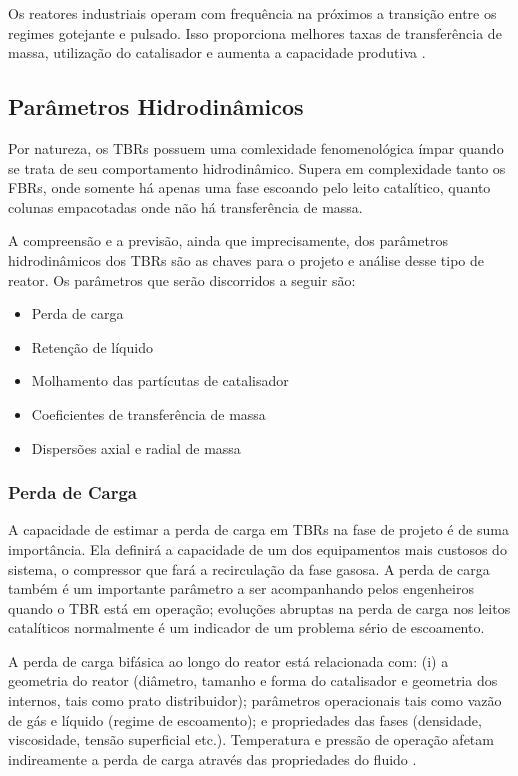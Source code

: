 Os reatores industriais operam com frequência na próximos a transição entre os
regimes gotejante e pulsado. Isso proporciona melhores taxas de transferência de
massa, utilização do catalisador e aumenta a capacidade produtiva
\cite{Ancheyta2011}.

\subsection{Parâmetros Hidrodinâmicos}
\label{sec:parametroshidrodinamicos}

Por natureza, os TBRs possuem uma comlexidade fenomenológica ímpar quando se
trata de seu comportamento hidrodinâmico. Supera em complexidade tanto os FBRs,
onde somente há apenas uma fase escoando pelo leito catalítico, quanto colunas
empacotadas onde não há transferência de massa. 

A compreensão e a previsão, ainda que imprecisamente, dos parâmetros
hidrodinâmicos dos TBRs são as chaves para o projeto e análise desse tipo de
reator. Os parâmetros que serão discorridos a seguir são:

\begin{itemize}
  \item Perda de carga
  \item Retenção de líquido
  \item Molhamento das partícutas de catalisador
  \item Coeficientes de transferência de massa
  \item Dispersões axial e radial de massa
\end{itemize}

\subsubsection{Perda de Carga}
\label{sec:perdadecarga}

A capacidade de estimar a perda de carga em TBRs na fase de projeto é de suma
importância. Ela definirá a capacidade de um dos equipamentos mais custosos do
sistema, o compressor que fará a recirculação da fase gasosa. A perda de carga
também é um importante parâmetro a ser acompanhando pelos engenheiros quando o
TBR está em operação; evoluções abruptas na perda de carga nos leitos
catalíticos normalmente é um indicador de um problema sério de
escoamento.

A perda de carga bifásica ao longo do reator está relacionada com: (i) a
geometria do reator (diâmetro, tamanho e forma do catalisador e geometria dos
internos, tais como prato distribuidor); parâmetros operacionais tais como vazão
de gás e líquido (regime de escoamento); e propriedades das fases (densidade,
viscosidade, tensão superficial etc.). Temperatura e pressão de operação afetam
indireamente a perda de carga através das propriedades do fluido
\cite{Ranade2011}.

